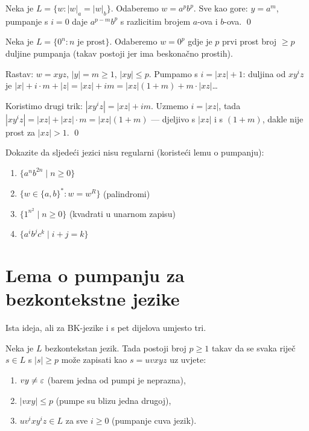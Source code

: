 \begin{primjer}[$\{w \in \{a,b\}^* : |w|_a = |w|_b\}$ nije regularan]
Neka je $L = \{w : |w|_a = |w|_b\}$. Odaberemo $w = a^p b^p$.
Sve kao gore: $y = a^m$, pumpanje s $i = 0$ daje $a^{p-m}b^p$
s razlicitim brojem $a$-ova i $b$-ova. \qed
\end{primjer}

\begin{primjer}
Neka je $L = \{0^n : n \text{ je prost}\}$.
Odaberemo $w = 0^p$ gdje je $p$ prvi prost broj $\geq p$ duljine
pumpanja (takav postoji jer ima beskonačno prostih).

Rastav: $w = xyz$, $|y| = m \geq 1$, $|xy| \leq p$.
Pumpamo s $i = |xz| + 1$: duljina od $xy^i z$ je
$|x| + i \cdot m + |z| = |xz| + im = |xz|(1 + m) + m \cdot |xz|$\ldots

Koristimo drugi trik: $|xy^i z| = |xz| + im$.
Uzmemo $i = |xz|$, tada $|xy^iz| = |xz| + |xz| \cdot m = |xz|(1+m)$
--- djeljivo s $|xz|$ i s $(1+m)$, dakle nije prost za $|xz| > 1$.
\qed
\end{primjer}

\begin{zadatak}
Dokazite da sljedeći jezici nisu regularni (koristeći lemu o pumpanju):
\begin{enumerate}[label=(\alph*)]
  \item $\{a^n b^{2n} \mid n \geq 0\}$
  \item $\{w \in \{a,b\}^* : w = w^R\}$ (palindromi)
  \item $\{1^{n^2} \mid n \geq 0\}$ (kvadrati u unarnom zapisu)
  \item $\{a^i b^j c^k \mid i + j = k\}$
\end{enumerate}
\end{zadatak}

\section{Lema o pumpanju za bezkontekstne jezike}

Ista ideja, ali za BK-jezike i s pet dijelova umjesto tri.

\begin{propozicija}
Neka je $L$ bezkontekstan jezik. Tada postoji broj $p \geq 1$
takav da se svaka riječ $s \in L$ s $|s| \geq p$ može zapisati
kao $s = uvxyz$ uz uvjete:
\begin{enumerate}[label=(\roman*)]
  \item $vy \neq \varepsilon$ \quad (barem jedna od pumpi je neprazna),
  \item $|vxy| \leq p$ \quad (pumpe su blizu jedna drugoj),
  \item $uv^i x y^i z \in L$ za sve $i \geq 0$ \quad (pumpanje cuva jezik).
\end{enumerate}
\end{propozicija}


